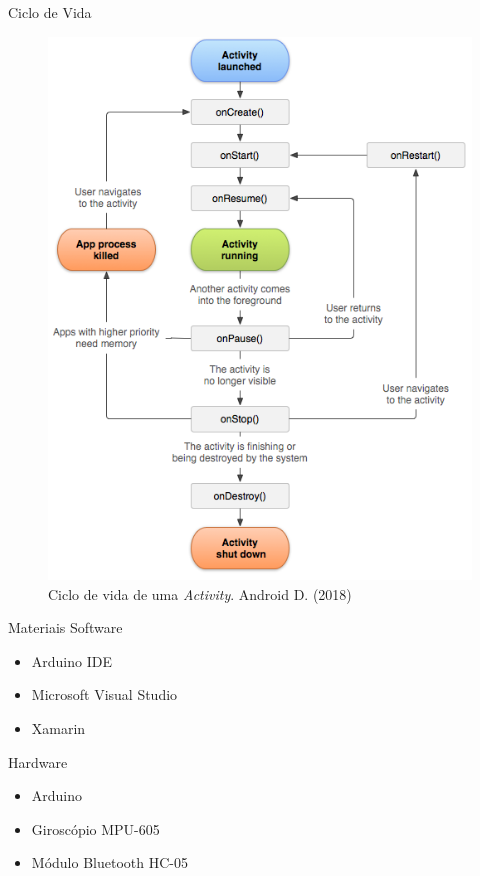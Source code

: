 \documentclass[12pt]{beamer}
\begin{document}
\begin{frame}{Ciclo de Vida}
    \begin{figure}[H]
    \centering
    \includegraphics[scale=.415]{demo/lifecicle.png}
    \caption{Ciclo de vida de uma \textit{Activity}. Android D. (2018)}
    \label{fig:lifecicle}
    \end{figure}
\end{frame}

\begin{frame} {Materiais}
 Software
 \begin{itemize}
     \item Arduino IDE
     \item Microsoft Visual Studio
     \item Xamarin
 \end{itemize}
 Hardware
 \begin{itemize}
     \item Arduino
     \item Giroscópio MPU-605
     \item Módulo Bluetooth HC-05
 \end{itemize}
\end{frame}
\end{document}
